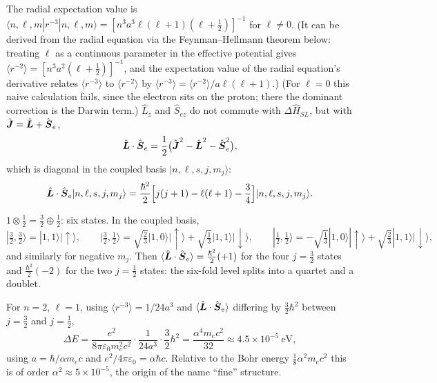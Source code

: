 The radial expectation value is $\langle n,\ell,m|r^{-3}|n,\ell,m\rangle = [n^3a^3\ell(\ell+1)(\ell+\frac12)]^{-1}$ for $\ell\neq0$. (It can be derived from the radial equation via the Feynman--Hellmann theorem below: treating $\ell$ as a continuous parameter in the effective potential gives $\langle r^{-2}\rangle = [n^3a^2(\ell+\frac12)]^{-1}$, and the expectation value of the radial equation's derivative relates $\langle r^{-3}\rangle$ to $\langle r^{-2}\rangle$ by $\langle r^{-3}\rangle = \langle r^{-2}\rangle/a\ell(\ell+1)$.) (For $\ell = 0$ this naive calculation fails, since the electron sits on the proton; there the dominant correction is the Darwin term.) $\hat{L}_z$ and $\hat{S}_{ez}$ do not commute with $\Delta\hat{H}_{SL}$, but with $\hat{\vect{J}} = \hat{\vect{L}} + \hat{\vect{S}}_e$,
\[
    \hat{\vect{L}}\cdot\hat{\vect{S}}_e = \frac12\bigl(\hat{\vect{J}}^2 - \hat{\vect{L}}^2 - \hat{\vect{S}}_e^2\bigr),
\]
which is diagonal in the coupled basis $|n,\ell,s,j,m_j\rangle$:
\[
    \hat{\vect{L}}\cdot\hat{\vect{S}}_e|n,\ell,s,j,m_j\rangle = \frac{\hbar^2}{2}\Bigl[j(j+1) - \ell(\ell+1) - \frac34\Bigr]|n,\ell,s,j,m_j\rangle .
\]

\begin{example}[The $\ell = 1$ level]
$1\otimes\frac12 = \frac32\oplus\frac12$: six states. In the coupled basis,
\[
    |\tfrac32,\tfrac32\rangle = |1,1\rangle|{\uparrow}\rangle,
    \qquad
    |\tfrac32,\tfrac12\rangle = \sqrt{\tfrac23}|1,0\rangle|{\uparrow}\rangle + \sqrt{\tfrac13}|1,1\rangle|{\downarrow}\rangle,
    \qquad
    |\tfrac12,\tfrac12\rangle = -\sqrt{\tfrac13}|1,0\rangle|{\uparrow}\rangle + \sqrt{\tfrac23}|1,1\rangle|{\downarrow}\rangle,
\]
and similarly for negative $m_j$. Then $\langle\hat{\vect{L}}\cdot\hat{\vect{S}}_e\rangle = \frac{\hbar^2}{2}(+1)$ for the four $j = \frac32$ states and $\frac{\hbar^2}{2}(-2)$ for the two $j = \frac12$ states: the six-fold level splits into a quartet and a doublet.
\end{example}

\begin{example}
For $n = 2$, $\ell = 1$, using $\langle r^{-3}\rangle = 1/24a^3$ and $\langle\hat{\vect{L}}\cdot\hat{\vect{S}}_e\rangle$ differing by $\frac32\hbar^2$ between $j = \frac32$ and $j = \frac12$,
\[
    \Delta E = \frac{e^2}{8\pi\varepsilon_0m_e^2c^2}\cdot\frac{1}{24a^3}\cdot\frac32\hbar^2 = \frac{\alpha^4m_ec^2}{32}\approx4.5\times10^{-5}\ \text{eV},
\]
using $a = \hbar/\alpha m_ec$ and $e^2/4\pi\varepsilon_0 = \alpha\hbar c$. Relative to the Bohr energy $\frac18\alpha^2m_ec^2$ this is of order $\alpha^2\approx5\times10^{-5}$, the origin of the name ``fine'' structure.
\end{example}

